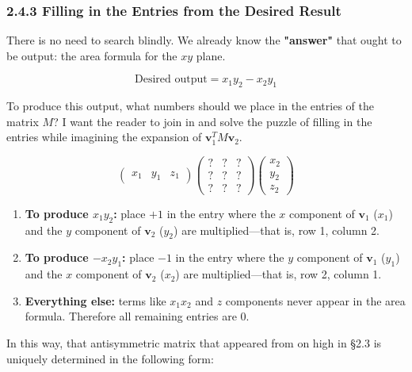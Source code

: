 \hypertarget{filling-in-the-entries-from-the-desired-result}{%
\subsubsection{2.4.3 Filling in the Entries from the Desired
Result}\label{filling-in-the-entries-from-the-desired-result}}

There is no need to search blindly. We already know the
\textbf{"answer"} that ought to be output: the area formula for the
\(xy\) plane.

\[\text{Desired output} = x_1 y_2 - x_2 y_1\]

To produce this output, what numbers should we place in the entries of
the matrix \(M\)? I want the reader to join in and solve the puzzle of
filling in the entries while imagining the expansion of
\(\mathbf{v}_1^T M \mathbf{v}_2\).

\[
\begin{pmatrix} x_1 & y_1 & z_1 \end{pmatrix}
\begin{pmatrix}
  ? & ? & ? \\
  ? & ? & ? \\
  ? & ? & ?
\end{pmatrix}
\begin{pmatrix} x_2 \\ y_2 \\ z_2 \end{pmatrix}
\]

\begin{enumerate}
\def\labelenumi{\arabic{enumi}.}
\tightlist
\item
  \textbf{To produce \(x_1 y_2\):} place \(+1\) in the entry where the
  \(x\) component of \(\mathbf{v}_1\) (\(x_1\)) and the \(y\) component
  of \(\mathbf{v}_2\) (\(y_2\)) are multiplied---that is, row 1, column
  2.
\item
  \textbf{To produce \(-x_2 y_1\):} place \(-1\) in the entry where the
  \(y\) component of \(\mathbf{v}_1\) (\(y_1\)) and the \(x\) component
  of \(\mathbf{v}_2\) (\(x_2\)) are multiplied---that is, row 2, column
  1.
\item
  \textbf{Everything else:} terms like \(x_1 x_2\) and \(z\) components
  never appear in the area formula. Therefore all remaining entries are
  \(0\).
\end{enumerate}

In this way, that antisymmetric matrix that appeared from on high in
§2.3 is uniquely determined in the following form:

